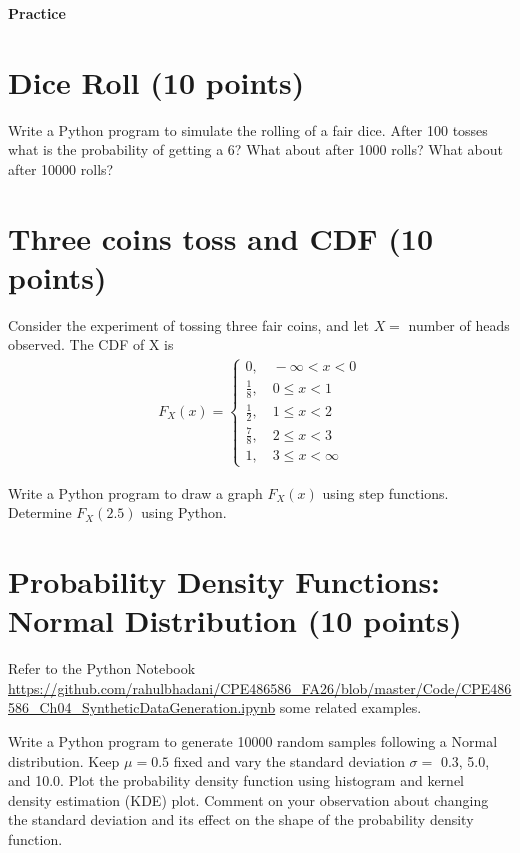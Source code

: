 \documentclass[12pt, xcolor=dvipsnames,svgnames,x11names]{article}
\begin{document}
\bigskip

\bigskip

{{\LARGE \textbf{Practice}}}

    \section{Dice Roll (10 points)}
    

Write a Python program to simulate the rolling of a  fair dice. After 100 tosses what is the probability of getting a 6? What about after 1000 rolls? What about after 10000 rolls?

 \section{Three coins toss and CDF (10 points)}
Consider the experiment of tossing three fair coins, and let $X = $ number of heads observed. The CDF of X is 
\begin{equation}
    \begin{aligned}
        F_X(x) = \begin{cases}
            0, \quad -\infty  < x < 0\\
            \frac{1}{8}, \quad 0\leq x < 1\\
            \frac{1}{2}, \quad 1 \leq x < 2\\
            \frac{7}{8}, \quad 2 \leq x < 3\\
            1, \quad 3 \leq x < \infty
        \end{cases}
    \end{aligned}
\end{equation}

Write a Python program to draw a graph $F_X(x)$ using step functions. Determine $F_X(2.5)$ using Python.


\section{Probability Density Functions: Normal Distribution (10 points)}
Refer to the Python Notebook \url{https://github.com/rahulbhadani/CPE486586_FA26/blob/master/Code/CPE486586_Ch04_SyntheticDataGeneration.ipynb} some related examples.


Write a Python program to generate 10000 random samples following a Normal distribution. Keep $\mu = 0.5$ fixed and vary the standard deviation $\sigma  = $ 0.3, 5.0, and 10.0. Plot the probability density function using histogram and kernel density estimation (KDE) plot. Comment on your observation about changing the standard deviation and its effect on the shape of the probability density function.
\end{document}
